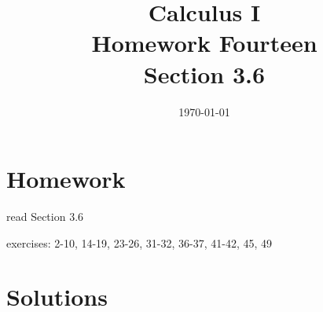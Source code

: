 \documentclass[letterpaper, landscape]{exam}
\title{Calculus I \\ Homework Fourteen \\ Section 3.6}
\author{}
\date{\today}
\begin{document}
  \maketitle

  \section{Homework}
    \begin{itemize*}
      \item read Section 3.6
      \item exercises: 2-10, 14-19, 23-26, 31-32, 36-37, 41-42, 45, 49
    \end{itemize*}

  \ifprintanswers

  \section{Solutions}
\end{document}
